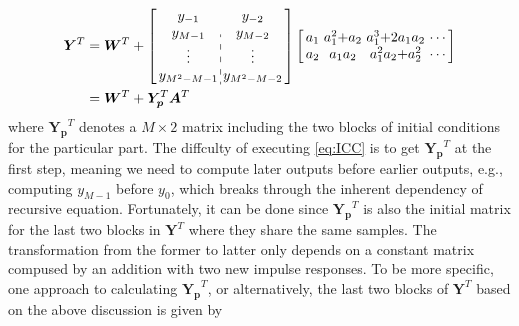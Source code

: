 \begin{equation}
    \label{eq:ICC}
    \begin{aligned}
        \bm{Y}^T &= \bm{W}^T + \left[\arraycolsep=1.6pt\def\arraystretch{1.0}
                \begin{array}{c:c}
                y_{-1} & y_{-2} \\ 
                y_{M-1} & y_{M-2} \\
                \vdots & \vdots \\
                y_{M^2-M-1} & y_{M^2-M-2}
                \end{array}\right]  
                \left[\arraycolsep=1.6pt\def\arraystretch{1.0}
                    \begin{array}{cccc}
                    a_1 & a_1^2{+}a_2 & a_1^3{+}2a_1a_2 & \cdots \\ 
                    a_2 & a_1a_2 & a_1^2a_2{+}a_2^2 & \cdots \\
                    \end{array}\right] \\
        & = \bm{W}^T + \bm{Y_p}^T  \bm{A}^T
    \end{aligned}
\end{equation}
where $\bm{Y_p}^T$ denotes a $M \times 2$ matrix including the two blocks of initial conditions for the particular part.
The diffculty of executing \eqref{eq:ICC} is to get $\bm{Y_p}^T$ at the first step,
meaning we need to compute later outputs before earlier outputs, e.g.,
computing $y_{M-1}$ before $y_0$, which breaks through the inherent dependency of recursive equation.
Fortunately, it can be done since $\bm{Y_p}^T$ is also the initial matrix 
for the last two blocks in $\bm{Y}^T$ where they share the same samples.
The transformation from the former to latter only depends on a constant matrix compused by 
an addition with two new impulse responses. To be more specific,
one approach to calculating $\bm{Y_p}^T$, or alternatively, 
the last two blocks of $\bm{Y}^T$ based on the above discussion is given by

